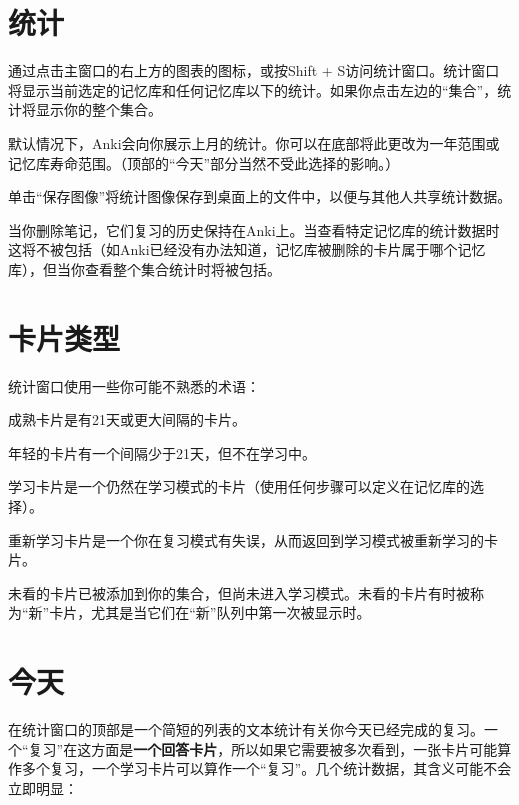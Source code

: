 \documentclass[a4paper]{book}
\begin{document}
		\section{统计}\label{stats}
		
		通过点击主窗口的右上方的图表的图标，或按Shift + S访问统计窗口。统计窗口将显示当前选定的记忆库和任何记忆库以下的统计。如果你点击左边的“集合”，统计将显示你的整个集合。
		
		默认情况下，Anki会向你展示上月的统计。你可以在底部将此更改为一年范围或记忆库寿命范围。（顶部的“今天”部分当然不受此选择的影响。）
		
		单击“保存图像”将统计图像保存到桌面上的文件中，以便与其他人共享统计数据。
		
		
		\begin{shaded}
			当你删除笔记，它们复习的历史保持在Anki上。当查看特定记忆库的统计数据时这将不被包括（如Anki已经没有办法知道，记忆库被删除的卡片属于哪个记忆库），但当你查看整个集合统计时将被包括。
		\end{shaded}
		
		\section{卡片类型}
		统计窗口使用一些你可能不熟悉的术语：
		\begin{description}
			\itemsep1pt\parskip0pt
			\item[成熟] 成熟卡片是有21天或更大间隔的卡片。
			\item[年轻] 年轻的卡片有一个间隔少于21天，但不在学习中。
			\item[学习] 学习卡片是一个仍然在学习模式的卡片（使用任何步骤可以定义在记忆库的选择）。
			\item[重新学习] 重新学习卡片是一个你在复习模式有失误，从而返回到学习模式被重新学习的卡片。
			\item[未看] 未看的卡片已被添加到你的集合，但尚未进入学习模式。未看的卡片有时被称为“新”卡片，尤其是当它们在“新”队列中第一次被显示时。               
		\end{description}
		
		\section{今天}
		
		在统计窗口的顶部是一个简短的列表的文本统计有关你今天已经完成的复习。一个“复习”在这方面是\textbf{一个回答卡片}，所以如果它需要被多次看到，一张卡片可能算作多个复习，一个学习卡片可以算作一个“复习”。几个统计数据，其含义可能不会立即明显：
		
\end{document}
